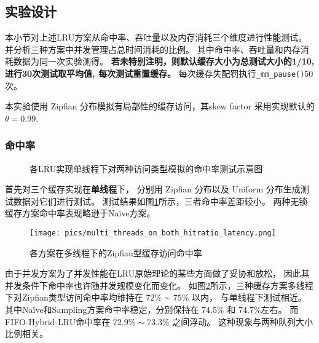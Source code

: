 \subsection{实验设计}

本小节对上述LRU方案从命中率、吞吐量以及内存消耗三个维度进行性能测试。
并分析三种方案中并发管理占总时间消耗的比例。
其中命中率、吞吐量和内存消耗数据为同一次实验测得。
\textbf{若未特别注明，则默认缓存大小为总测试大小的1/10, 进行30次测试取平均值, 每次测试重置缓存。}
每次缓存失配罚执行\verb|_mm_pause()|50次。

本实验使用 Zipfian 分布模拟有局部性的缓存访问，其skew factor 采用实现默认的$\theta = 0.99$\cite{dirtyzipf2024}.

\subsubsection{命中率}

\begin{figure}
    \caption{各LRU实现单线程下对两种访问类型模拟的命中率测试示意图}
    \label{fig:dist_on_3_1thread}
\end{figure}

首先对三个缓存实现在\textbf{单线程}下，
分别用 Zipfian 分布以及 Uniform 分布生成测试数据对它们进行测试。
测试结果如图\ref{fig:dist_on_3_1thread}所示，三者命中率差距较小。
两种无锁缓存方案命中率表现略逊于Na\"{i}ve方案。

\begin{figure}
    \centering
    \texttt{[image: pics/multi\_threads\_on\_both\_hitratio\_latency.png]}
    \caption{各方案在多线程下的Zipfian型缓存访问命中率}
    \label{fig:dist_multithread}
\end{figure}

由于并发方案为了并发性能在LRU原始理论的某些方面做了妥协和放松，
因此其并发条件下命中率也许随并发规模变化而变化。
如图\ref{fig:dist_multithread}所示，三种缓存方案多线程下对Zipfian类型访问命中率均维持在 $72\% \sim 75\%$ 以内，
与单线程下测试相近。
其中Na\"{i}ve和Sampling方案命中率稳定，分别保持在 $74.5\%$ 和 $74.7\%$左右。
而FIFO-Hybrid-LRU命中率在 $72.9\% \sim 73.3\%$ 之间浮动。
这种现象与两种队列大小比例相关。

